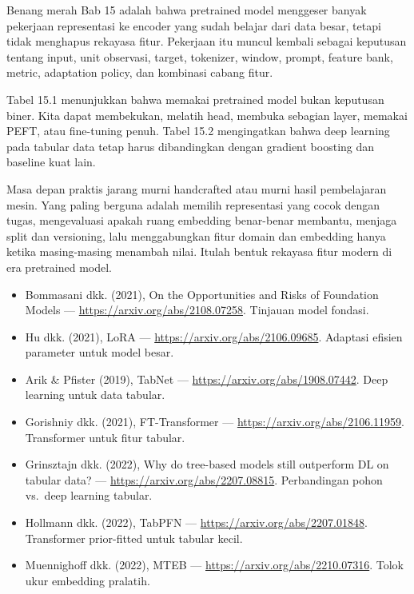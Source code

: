 \begin{sintesis}

Benang merah Bab 15 adalah bahwa pretrained model menggeser banyak pekerjaan representasi ke encoder yang sudah belajar dari data besar, tetapi tidak menghapus rekayasa fitur. Pekerjaan itu muncul kembali sebagai keputusan tentang input, unit observasi, target, tokenizer, window, prompt, feature bank, metric, adaptation policy, dan kombinasi cabang fitur.

Tabel 15.1 menunjukkan bahwa memakai pretrained model bukan keputusan biner. Kita dapat membekukan, melatih head, membuka sebagian layer, memakai PEFT, atau fine-tuning penuh. Tabel 15.2 mengingatkan bahwa deep learning pada tabular data tetap harus dibandingkan dengan gradient boosting dan baseline kuat lain.

Masa depan praktis jarang murni handcrafted atau murni hasil pembelajaran mesin. Yang paling berguna adalah memilih representasi yang cocok dengan tugas, mengevaluasi apakah ruang embedding benar-benar membantu, menjaga split dan versioning, lalu menggabungkan fitur domain dan embedding hanya ketika masing-masing menambah nilai. Itulah bentuk rekayasa fitur modern di era pretrained model.

\end{sintesis}

\begin{bacaan}

\begin{itemize}
\tightlist
\item
  Bommasani dkk. (2021), On the Opportunities and Risks of Foundation Models --- \url{https://arxiv.org/abs/2108.07258}. Tinjauan model fondasi.
\item
  Hu dkk. (2021), LoRA --- \url{https://arxiv.org/abs/2106.09685}. Adaptasi efisien parameter untuk model besar.
\item
  Arik \& Pfister (2019), TabNet --- \url{https://arxiv.org/abs/1908.07442}. Deep learning untuk data tabular.
\item
  Gorishniy dkk. (2021), FT-Transformer --- \url{https://arxiv.org/abs/2106.11959}. Transformer untuk fitur tabular.
\item
  Grinsztajn dkk. (2022), Why do tree-based models still outperform DL on tabular data? --- \url{https://arxiv.org/abs/2207.08815}. Perbandingan pohon vs.~deep learning tabular.
\item
  Hollmann dkk. (2022), TabPFN --- \url{https://arxiv.org/abs/2207.01848}. Transformer prior-fitted untuk tabular kecil.
\item
  Muennighoff dkk. (2022), MTEB --- \url{https://arxiv.org/abs/2210.07316}. Tolok ukur embedding pralatih.
\end{itemize}

\end{bacaan}

